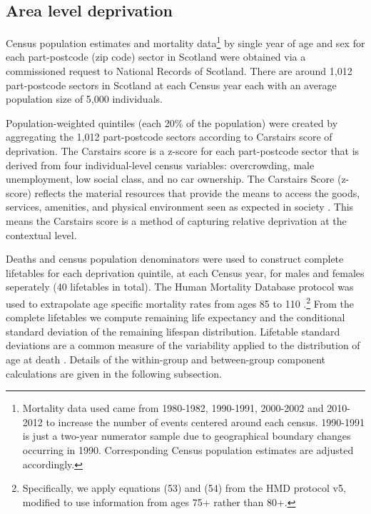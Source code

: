 \documentclass[12pt,oneside,a4paper]{article} %
\theoremstyle{definition}
\begin{document}
\subsection{Area level deprivation}
Census population estimates and mortality data\footnote{Mortality data used
came from 1980-1982, 1990-1991, 2000-2002 and 2010-2012 to increase the
number of events centered around each census. 1990-1991 is just a two-year
numerator sample due to geographical boundary changes occurring in 1990.
Corresponding Census population estimates are adjusted accordingly.} by single
year of age and sex for each part-postcode (zip code) sector in Scotland were obtained via a commissioned request to National Records of Scotland. There are around 1,012 part-postcode sectors in Scotland at each Census year each with an average population size of 5,000 individuals.
 
Population-weighted quintiles (each 20\% of the population) were created by
aggregating the 1,012 part-postcode sectors according to Carstairs score of
deprivation. The Carstairs score is a z-score for each part-postcode sector
that is derived from four individual-level census variables: overcrowding, male
unemployment, low social class, and no car ownership. The Carstairs Score
(z-score) reflects the material resources that provide the means to access the
goods, services, amenities, and physical environment seen as expected
in society \citep{Carstairs1989}. This means the Carstairs score is a method of capturing relative deprivation at the contextual level.

Deaths and census population denominators were used to construct complete
lifetables for each deprivation quintile, at each Census year, for males and
females seperately (40 lifetables in total). The Human Mortality Database
protocol was used to extrapolate age specific mortality rates from ages 85 to
110 \citep{Wilmoth2007}.\footnote{Specifically, we apply equations (53) and
(54) from the HMD protocol v5, modified to use information from ages 75+
rather than 80+.} From the complete lifetables we compute remaining
life expectancy and the conditional standard deviation of the remaining lifespan
distribution. Lifetable standard deviations are a common measure of the
variability applied to the distribution of age at death \citep{Raalte2013}. Details of the within-group and between-group component calculations are given in the following subsection.
\end{document}

